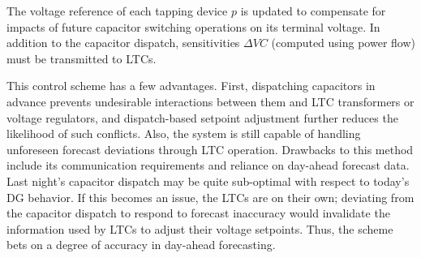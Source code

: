 \documentclass[10pt,letterpaper]{article}
\begin{document}
The voltage reference of each tapping device $p$ is updated to compensate for impacts of future capacitor switching operations on its terminal voltage. In addition to the capacitor dispatch, sensitivities $\Delta VC$ (computed using power flow) must be transmitted to LTCs.

This control scheme has a few advantages. First, dispatching capacitors in advance prevents undesirable interactions between them and LTC transformers or voltage regulators, and dispatch-based setpoint adjustment further reduces the likelihood of such conflicts. Also, the system is still capable of handling unforeseen forecast deviations through LTC operation. Drawbacks to this method include its communication requirements and reliance on day-ahead forecast data. Last night's capacitor dispatch may be quite sub-optimal with respect to today's DG behavior. If this becomes an issue, the LTCs are on their own; deviating from the capacitor dispatch to respond to forecast inaccuracy would invalidate the information used by LTCs to adjust their voltage setpoints. Thus, the scheme bets on a degree of accuracy in day-ahead forecasting.
\end{document}
